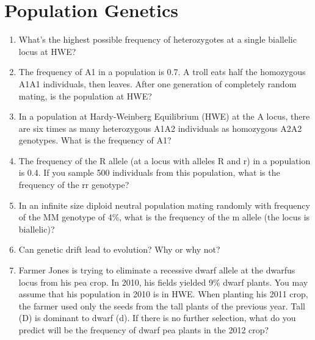 \documentclass[]{article}
\begin{document}
\section*{Population Genetics}

\begin{enumerate}
\item What’s the highest possible frequency of heterozygotes at a single biallelic locus at HWE?

\item The frequency of A1 in a population is 0.7.  A troll eats half the homozygous A1A1 individuals, then leaves.  After one generation of completely random mating, is the population at HWE?

\item  In a population at Hardy-Weinberg Equilibrium (HWE) at the A locus, there are six times as many heterozygous A1A2 individuals as homozygous A2A2 genotypes.  What is the frequency of A1?

\item The frequency of the R allele (at a locus with alleles R and r) in a population is 0.4.  If you sample 500 individuals from this population, what is the frequency of the rr genotype? 

\item  In an infinite size diploid neutral population mating randomly with frequency of the MM genotype of 4\%, what is the frequency of the m allele (the locus is biallelic)?

\item  Can genetic drift lead to evolution?  Why or why not?

\item Farmer Jones is trying to eliminate a recessive dwarf allele at the dwarfus locus from his pea crop. In 2010, his fields yielded 9\% dwarf plants. You may assume that his population in 2010 is in HWE. When planting his 2011 crop, the farmer used only the seeds from the tall plants of the previous year. Tall (D) is dominant to dwarf (d). If there is no further selection, what do you predict will be the frequency of dwarf pea plants in the 2012 crop?

\end{enumerate}

\end{document}
